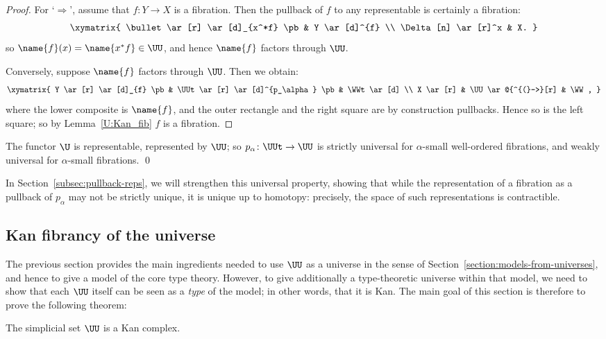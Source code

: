 \begin{proof}
 For `$\Rightarrow$', assume that $f \colon Y \to X$ is a fibration. Then the pullback of $f$ to any representable is certainly a fibration:
 \[\xymatrix{ \bullet \ar[r] \ar[d]_{x^*f} \pb & Y \ar[d]^{f} \\
 \Delta [n] \ar[r]^x & X.
 }\]
 so $\name{f}(x) =\name{ x^*f} \in \UU$, and hence $\name{f}$ factors through $\UU$.

 Conversely, suppose $\name{f}$ factors through $\UU$. Then we obtain:
 \[\xymatrix{ Y \ar[r] \ar[d]_{f} \pb & \UUt \ar[r] \ar[d]^{p_\alpha} \pb & \WWt \ar[d] \\
 X \ar[r] & \UU \ar@{^{(}->}[r] & \WW,
 }\]
 where the lower composite is $\name{f}$, and the outer rectangle and the right square are by construction pullbacks.  Hence so is the left square; so by Lemma~\ref{U:Kan_fib} $f$ is a fibration.
\end{proof}

\begin{corollary} \label{cor:U_classifies}
The functor $\U$ is representable, represented by $\UU$; so ${p_\alpha} \colon \UUt \to \UU$ is strictly universal for $\alpha$-small well-ordered fibrations, and weakly universal for $\alpha$-small fibrations. \qed
\end{corollary}

In Section~\ref{subsec:pullback-reps}, we will strengthen this universal property, showing that while the representation of a fibration as a pullback of $p_\alpha$ may not be strictly unique, it is unique up to homotopy: precisely, the space of such representations is contractible.

\subsection{Kan fibrancy of the universe}  \label{subsec:fibrancy-of-u}

The previous section provides the main ingredients needed to use $\UU$ as a universe in the sense of Section~\ref{section:models-from-universes}, and hence to give a model of the core type theory.  However, to give additionally a type-theoretic universe within that model, we need to show that each $\UU$ itself can be seen as a \emph{type} of the model; in other words, that it is Kan.  The main goal of this section is therefore to prove the following theorem:

\begin{theorem}\label{U:KanCpx}
 The simplicial set $\UU$ is a Kan complex.
\end{theorem}

